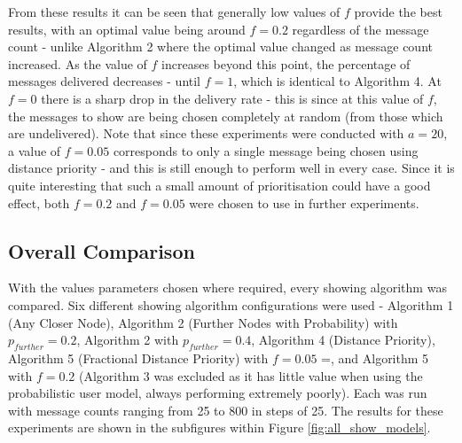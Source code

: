 \documentclass[bsc,frontabs,twoside,singlespacing,parskip,deptreport]{infthesis}     %
\begin{document}
From these results it can be seen that generally low values of $f$ provide the best results, with an optimal value being around $f=0.2$ regardless of the message count - unlike Algorithm 2 where the optimal value changed as message count increased. As the value of $f$ increases beyond this point, the percentage of messages delivered decreases - until $f=1$, which is identical to Algorithm 4. At $f=0$ there is a sharp drop in the delivery rate - this is since at this value of $f$, the messages to show are being chosen completely at random (from those which are undelivered). Note that since these experiments were conducted with $a=20$, a value of $f=0.05$ corresponds to only a single message being chosen using distance priority - and this is still enough to perform well in every case. Since it is quite interesting that such a small amount of prioritisation could have a good effect, both $f=0.2$ and $f=0.05$ were chosen to use in further experiments.


\subsection{Overall Comparison} \label{subsec:all_show_models_results}
With the values parameters chosen where required, every showing algorithm was compared. Six different showing algorithm configurations were used - Algorithm 1 (Any Closer Node), Algorithm 2 (Further Nodes with Probability) with $p_{further}=0.2$, Algorithm 2 with $p_{further}=0.4$, Algorithm 4 (Distance Priority), Algorithm 5 (Fractional Distance Priority) with $f=0.05$ =, and Algorithm 5 with $f=0.2$ (Algorithm 3 was excluded as it has little value when using the probabilistic user model, always performing extremely poorly). Each was run with message counts ranging from 25 to 800 in steps of 25. The results for these experiments are shown in the subfigures within Figure \ref{fig:all_show_models}.
\end{document}

